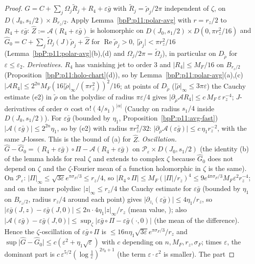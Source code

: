 \begin{proof}
\label{stepP:p11:as-osc} $G=C+\sum_j\Omega_j\tilde R_j+R_4+\varepsilon\bar g$ with $\tilde R_j=\tilde\rho_j/2\pi$ independent of $\zeta$, on $D(J_0,s_1/2)\times B_{r_z/2}$. Apply Lemma~\ref{bpP:p11:polar-avg} with $r=r_z/2$ to $R_4+\varepsilon\bar g$: $\hat Z:=\mathcal A(R_4+\varepsilon\bar g)$ is holomorphic on $D(J_0,s_1/2)\times D(0,\pi r_z^2/16)$ and $\hat G_0=C+\sum_j\tilde\Omega_j(J)\tilde\rho_j+\hat Z$ for $\operatorname{Re}\tilde\rho_j>0$, $\lvert\tilde\rho_j\rvert<\pi r_z^2/16$ (Lemma~\ref{bpP:p11:polar-avg}(b),(d) and $\Omega_j/2\pi=\tilde\Omega_j$), in particular on $D_{\tilde\rho}$ for $\varepsilon\le\varepsilon_2$. \emph{Derivatives.} $R_4$ has vanishing jet to order $3$ and $\lvert R_4\rvert\le M_F/16$ on $B_{r_z/2}$ (Proposition~\ref{bpP:p11:holo-chart}(d)), so by Lemma~\ref{bpP:p11:polar-avg}(a),(c) $\lvert\mathcal AR_4\rvert\le2^{2n}M_F(16\lvert\tilde\rho\rvert_\infty/(\pi r_z^2))^2/16$; at points of $D_{\tilde\rho}$ ($\lvert\tilde\rho\rvert_\infty\le3\pi\varepsilon$) the Cauchy estimate (e2) in $\tilde\rho$ on the polydisc of radius $\pi\varepsilon/4$ gives $\lvert\partial_{\tilde\rho}\mathcal AR_4\rvert\le c\,M_F\,\varepsilon\,r_z^{-4}$; $J$-derivatives of order $\alpha$ cost $\alpha!(4/s_1)^{\lvert\alpha\rvert}$ (Cauchy on radius $s_1/4$ inside $D(J_0,s_1/2)$). For $\varepsilon\bar g$ (bounded by $\eta_1$, Proposition~\ref{bpP:p11:avg-fast}) $\lvert\mathcal A(\varepsilon\bar g)\rvert\le2^{2n}\eta_1$, so by (e2) with radius $\pi r_z^2/32$: $\lvert\partial_{\tilde\rho}\mathcal A(\varepsilon\bar g)\rvert\le c\,\eta_1r_z^{-2}$, with the same $J$-losses. This is the bound of (a) for $\hat Z$. \emph{Oscillation.} $\hat G-\hat G_0=(R_4+\varepsilon\bar g)\circ\Pi-\mathcal A(R_4+\varepsilon\bar g)$ on $\mathcal P_\varepsilon\times D(J_0,s_1/2)$ (the identity (b) of the lemma holds for real $\zeta$ and extends to complex $\zeta$ because $\hat G_0$ does not depend on $\zeta$ and the $\zeta$-Fourier mean of a function holomorphic in $\zeta$ is the same). On $\mathcal P_\varepsilon$: $\lvert\Pi\rvert_\infty\le\sqrt{3\varepsilon}e^{\pi\sigma_F/3}\le r_z/4$, so $\lvert R_4\circ\Pi\rvert\le M_F(\lvert\Pi\rvert/r_z)^4\le9e^{4\pi\sigma_F/3}M_F\varepsilon^2r_z^{-4}$; and on the inner polydisc $\lvert z\rvert_\infty\le r_z/4$ the Cauchy estimate for $\varepsilon\bar g$ (bounded by $\eta_1$ on $B_{r_z/2}$, radius $r_z/4$ around each point) gives $\lvert\partial_{z_i}(\varepsilon\bar g)\rvert\le4\eta_1/r_z$, so $\lvert\varepsilon\bar g(J,z)-\varepsilon\bar g(J,0)\rvert\le2n\cdot4\eta_1\lvert z\rvert_\infty/r_z$ (mean value, ); also $\lvert\mathcal A(\varepsilon\bar g)-\varepsilon\bar g(J,0)\rvert\le\sup_\zeta\lvert\varepsilon\bar g\circ\Pi-\varepsilon\bar g(\cdot,0)\rvert$ (the mean of the difference). Hence the $\zeta$-oscillation of $\varepsilon\bar g\circ\Pi$ is $\le16n\eta_1\sqrt{3\varepsilon}e^{\pi\sigma_F/3}/r_z$ and $\sup\lvert\hat G-\hat G_0\rvert\le c(\varepsilon^2+\eta_1\sqrt\varepsilon)$ with $c$ depending on $n,M_F,r_z,\sigma_F$; times $\varepsilon$, the dominant part is $c\,\varepsilon^{5/2}(\log\frac1\varepsilon)^{2\tau_0+1}$ (the term $\varepsilon\cdot\varepsilon^2$ is smaller). The part 
\end{proof}
